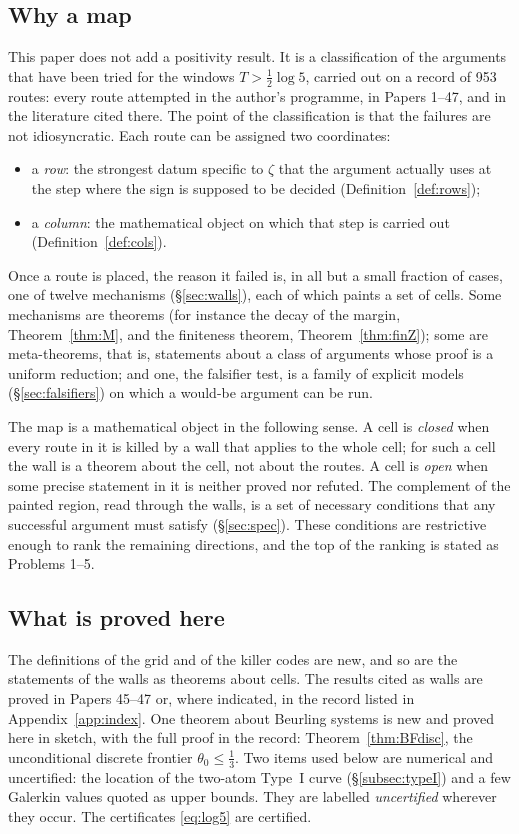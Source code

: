 \documentclass[11pt]{amsart}
\theoremstyle{definition}
\theoremstyle{remark}
\begin{document}
\subsection{Why a map}
This paper does not add a positivity result. It is a classification of the arguments that have been
tried for the windows $T>\frac12\log5$, carried out on a record of 953 routes: every route attempted
in the author's programme, in Papers 1--47, and in the literature cited there. The point of the
classification is that the failures are not idiosyncratic. Each route can be assigned two coordinates:
\begin{itemize}
\item a \emph{row}: the strongest datum specific to $\zeta$ that the argument actually uses at the step
where the sign is supposed to be decided (Definition~\ref{def:rows});
\item a \emph{column}: the mathematical object on which that step is carried out
(Definition~\ref{def:cols}).
\end{itemize}
Once a route is placed, the reason it failed is, in all but a small fraction of cases, one of twelve
mechanisms (\S\ref{sec:walls}), each of which paints a set of cells. Some mechanisms are theorems
(for instance the decay of the margin, Theorem~\ref{thm:M}, and the finiteness theorem,
Theorem~\ref{thm:finZ}); some are meta-theorems, that is, statements about a class of arguments whose
proof is a uniform reduction; and one, the falsifier test, is a family of explicit models
(\S\ref{sec:falsifiers}) on which a would-be argument can be run.

The map is a mathematical object in the following sense. A cell is \emph{closed} when every route in it
is killed by a wall that applies to the whole cell; for such a cell the wall is a theorem about
the cell, not about the routes. A cell is \emph{open} when some precise statement in it is neither
proved nor refuted. The complement of the painted region, read through the walls, is a set of
necessary conditions that any successful argument must satisfy (\S\ref{sec:spec}). These conditions are
restrictive enough to rank the remaining directions, and the top of the ranking is stated as Problems
1--5.

\subsection{What is proved here}
The definitions of the grid and of the killer codes are new, and so are the statements of the walls as
theorems about cells. The results cited as walls are proved in Papers 45--47 or, where indicated, in
the record listed in Appendix~\ref{app:index}. One theorem about Beurling systems is new and proved here in
sketch, with the full proof in the record: Theorem~\ref{thm:BFdisc}, the unconditional discrete frontier $\theta_0\le\frac13$.
Two items used below are numerical and uncertified:
the location of the two-atom Type~I curve (\S\ref{subsec:typeI}) and a few Galerkin values quoted as
upper bounds. They are labelled \emph{uncertified} wherever they occur. The certificates
\eqref{eq:log5} are certified.
\end{document}
